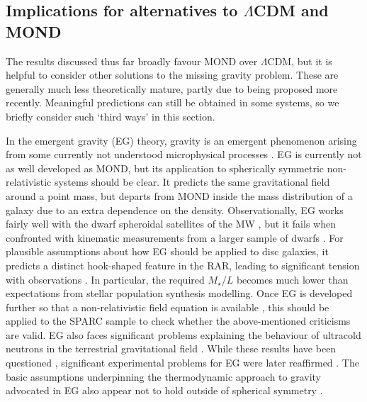 \documentclass[fleqn,usenatbib,useAMS,onecolumn]{mnras} %
\begin{document}
\subsection{Implications for alternatives to \texorpdfstring{$\Lambda$}{L}CDM and MOND}
\label{Alternatives_LCDM_MOND}

The results discussed thus far broadly favour MOND over $\Lambda$CDM, but it is helpful to consider other solutions to the missing gravity problem. These are generally much less theoretically mature, partly due to being proposed more recently. Meaningful predictions can still be obtained in some systems, so we briefly consider such `third ways' in this section.

In the emergent gravity (EG) theory, gravity is an emergent phenomenon arising from some currently not understood microphysical processes \citep{Verlinde_2017}. EG is currently not as well developed as MOND, but its application to spherically symmetric non-relativistic systems should be clear. It predicts the same gravitational field around a point mass, but departs from MOND inside the mass distribution of a galaxy due to an extra dependence on the density. Observationally, EG works fairly well with the dwarf spheroidal satellites of the MW \citep{Dias_Tejedor_2018}, but it fails when confronted with kinematic measurements from a larger sample of dwarfs \citep{Bradford_2015, Pardo_2020_EG}. For plausible assumptions about how EG should be applied to disc galaxies, it predicts a distinct hook-shaped feature in the RAR, leading to significant tension with observations \citep*{Lelli_2017_EG}. In particular, the required $M_{\star}/L$ becomes much lower than expectations from stellar population synthesis modelling. Once EG is developed further so that a non-relativistic field equation is available \citep[e.g.][]{Hossenfelder_2017}, this should be applied to the SPARC sample to check whether the above-mentioned criticisms are valid. EG also faces significant problems explaining the behaviour of ultracold neutrons in the terrestrial gravitational field \citep{Kobakhidze_2011}. While these results have been questioned \citep{Chaichian_2011}, significant experimental problems for EG were later reaffirmed \citep{Kobakhidze_2011b}. The basic assumptions underpinning the thermodynamic approach to gravity advocated in EG also appear not to hold outside of spherical symmetry \citep{Wang_2018_EG}.
\end{document}
